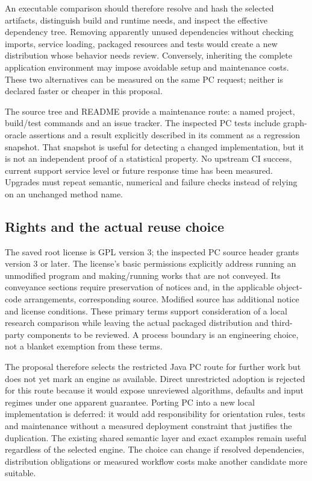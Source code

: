 An executable comparison should therefore resolve and hash the selected
artifacts, distinguish build and runtime needs, and inspect the
effective dependency tree. Removing apparently unused dependencies
without checking imports, service loading, packaged resources and tests
would create a new distribution whose behavior needs review. Conversely,
inheriting the complete application environment may impose avoidable
setup and maintenance costs. These two alternatives can be measured on
the same PC request; neither is declared faster or cheaper in this
proposal.

The source tree and README provide a maintenance route: a named project,
build/test commands and an issue tracker. The inspected PC tests include
graph-oracle assertions and a result explicitly described in its comment
as a regression snapshot. That snapshot is useful for detecting a
changed implementation, but it is not an independent proof of a
statistical property. No upstream CI success, current support service
level or future response time has been measured. Upgrades must repeat
semantic, numerical and failure checks instead of relying on an
unchanged method name. \citep{exec13_java_tetrad,
exec13_tetrad_reuse_primary}

\hypertarget{rights-and-the-actual-reuse-choice}{%
\subsection{Rights and the actual reuse
choice}\label{rights-and-the-actual-reuse-choice}}

The saved root license is GPL version 3; the inspected PC source header
grants version 3 or later. The license's basic permissions explicitly
address running an unmodified program and making/running works that are
not conveyed. Its conveyance sections require preservation of notices
and, in the applicable object-code arrangements, corresponding source.
Modified source has additional notice and license conditions. These
primary terms support consideration of a local research comparison while
leaving the actual packaged distribution and third-party components to
be reviewed. A process boundary is an engineering choice, not a blanket
exemption from these terms. \citep{exec13_tetrad_reuse_primary}

The proposal therefore selects the restricted Java PC route for further
work but does not yet mark an engine as available. Direct unrestricted
adoption is rejected for this route because it would expose unreviewed
algorithms, defaults and input regimes under one apparent guarantee.
Porting PC into a new local implementation is deferred: it would add
responsibility for orientation rules, tests and maintenance without a
measured deployment constraint that justifies the duplication. The
existing shared semantic layer and exact examples remain useful
regardless of the selected engine. The choice can change if resolved
dependencies, distribution obligations or measured workflow costs make
another candidate more suitable. \citep{exec13_tetrad_reuse_decision}

